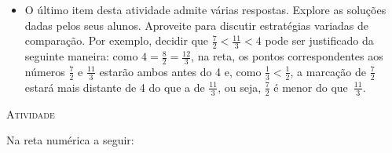 \documentclass[10 pt,usenames,dvipsnames, oneside]{article}
\begin{document}
\begin{goals}
\begin{itemize}
\begin{center}
      \end{center}
    \item       O último item desta atividade admite várias respostas. Explore as soluções dadas pelos seus alunos. Aproveite para discutir estratégias variadas de comparação. Por exemplo, decidir que $\frac{7}{2} < \frac{11}{3} < 4$ pode ser justificado da seguinte maneira: como $4 = \frac{8}{2} = \frac{12}{3}$, na reta, os pontos correspondentes aos números $\frac{7}{2}$ e $\frac{11}{3}$ estarão ambos antes do 4 e, como  $\frac{1}{3} < \frac{1}{2}$, a marcação de $\frac{7}{2}$ estará mais distante de 4 do que a de $\frac{11}{3}$, ou seja, $\frac{7}{2}$ é menor do que~$\frac{11}{3}$.
\end{itemize}
\end{goals}

\bigskip
\begin{center}
{\large \scshape Atividade}
\end{center}
\fi

Na reta numérica a seguir:

  
\begin{center}
\end{center}
\end{document}
